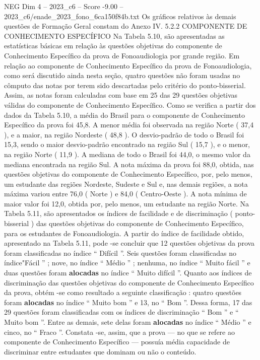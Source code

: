 \begin{textsample}{NEG Dim 4 – 2023\_c6 – Score -9.00 – 2023\_c6/enade\_2023\_fono\_6ca150f84b.txt}
Os gráficos relativos às demais questões de Formação Geral constam do Anexo IV. 5.2.2 COMPONENTE DE CONHECIMENTO ESPECÍFICO Na Tabela 5.10, são apresentadas as estatísticas básicas em relação às questões objetivas do componente de Conhecimento Específico da prova de Fonoaudiologia por grande região.
Em relação ao componente de Conhecimento Específico da prova de Fonoaudiologia, como será discutido ainda nesta seção, quatro questões não foram usadas no cômputo das notas por terem sido descartadas pelo critério do ponto-bisserial.
Assim, as notas foram calculadas com base em 25 das 29 questões objetivas válidas do componente de Conhecimento Específico.
Como se verifica a partir dos dados da Tabela 5.10, a média do Brasil para o componente de Conhecimento Específico da prova foi 45,8.
A menor média foi observada na região Norte ( 37,4 ), e a maior, na região Nordeste ( 48,8 ).
O desvio-padrão de todo o Brasil foi 15,3, sendo o maior desvio-padrão encontrado na região Sul ( 15,7 ), e o menor, na região Norte ( 11,9 ).
A mediana de todo o Brasil foi 44,0, o mesmo valor da mediana encontrada na região Sul.
A nota máxima da prova foi 88,0, obtida, nas questões objetivas do componente de Conhecimento Específico, por, pelo menos, um estudante das regiões Nordeste, Sudeste e Sul e, nas demais regiões, a nota máxima variou entre 76,0 ( Norte ) e 84,0 ( Centro-Oeste ).
A nota mínima de maior valor foi 12,0, obtida por, pelo menos, um estudante na região Norte.
Na Tabela 5.11, são apresentados os índices de facilidade e de discriminação ( ponto-bisserial ) das questões objetivas do componente de Conhecimento Específico, para os estudantes de Fonoaudiologia.
A partir do índice de facilidade obtido, apresentado na Tabela 5.11, pode -se concluir que 12 questões objetivas da prova foram classificadas no índice “ Difícil ”.
Seis questões foram classificadas no índice"Fácil ” ; nove, no índice “ Médio ” ; nenhuma, no índice “ Muito fácil ” e duas questões foram \textbf{alocadas} no índice “ Muito difícil ”.
Quanto aos índices de discriminação das questões objetivas do componente de Conhecimento Específico da prova, obtém -se como resultado a seguinte classificação : quatro questões foram \textbf{alocadas} no índice “ Muito bom ” e 13, no “ Bom ”.
Dessa forma, 17 das 29 questões foram classificadas com os índices de discriminação “ Bom ” e “ Muito bom ”.
Entre as demais, sete delas foram \textbf{alocadas} no índice “ Médio ” e cinco, no “ Fraco ”.
Constata -se, assim, que a prova — no que se refere ao componente de Conhecimento Específico — possuía média capacidade de discriminar entre estudantes que dominam ou não o conteúdo.

\end{textsample}
